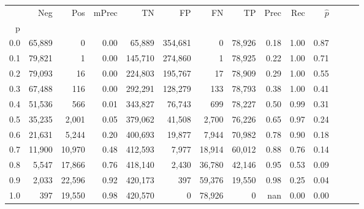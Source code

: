 \begin{tabular}{rrrrrrrrrrrrrr}
\toprule
{} &     Neg &     Pos & mPrec &       TN &       FP &      FN &      TP &  Prec &   Rec & $\hat{p}$ \\
p   &         &         &       &          &          &         &         &       &       &           \\
\midrule
0.0 &  65,889 &       0 &  0.00 &   65,889 &  354,681 &       0 &  78,926 &  0.18 &  1.00 &      0.87 \\
0.1 &  79,821 &       1 &  0.00 &  145,710 &  274,860 &       1 &  78,925 &  0.22 &  1.00 &      0.71 \\
0.2 &  79,093 &      16 &  0.00 &  224,803 &  195,767 &      17 &  78,909 &  0.29 &  1.00 &      0.55 \\
0.3 &  67,488 &     116 &  0.00 &  292,291 &  128,279 &     133 &  78,793 &  0.38 &  1.00 &      0.41 \\
0.4 &  51,536 &     566 &  0.01 &  343,827 &   76,743 &     699 &  78,227 &  0.50 &  0.99 &      0.31 \\
0.5 &  35,235 &   2,001 &  0.05 &  379,062 &   41,508 &   2,700 &  76,226 &  0.65 &  0.97 &      0.24 \\
0.6 &  21,631 &   5,244 &  0.20 &  400,693 &   19,877 &   7,944 &  70,982 &  0.78 &  0.90 &      0.18 \\
0.7 &  11,900 &  10,970 &  0.48 &  412,593 &    7,977 &  18,914 &  60,012 &  0.88 &  0.76 &      0.14 \\
0.8 &   5,547 &  17,866 &  0.76 &  418,140 &    2,430 &  36,780 &  42,146 &  0.95 &  0.53 &      0.09 \\
0.9 &   2,033 &  22,596 &  0.92 &  420,173 &      397 &  59,376 &  19,550 &  0.98 &  0.25 &      0.04 \\
1.0 &     397 &  19,550 &  0.98 &  420,570 &        0 &  78,926 &       0 &   nan &  0.00 &      0.00 \\
\bottomrule
\end{tabular}

